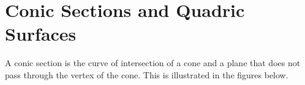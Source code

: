 \graphicspath{{figures/quadric/}}

\renewcommand{\theequation}{\thechapter.\arabic{equation}}
\renewcommand{\thetheorem}{\thechapter.\arabic{theorem}}
\renewcommand{\thebc}{\thechapter.\arabic{theorem}}
\renewcommand{\theeg}{\thechapter.\arabic{theorem}}


\chapter{Conic Sections and Quadric Surfaces}\label{ap:quadric}

A conic section is the curve of intersection of a cone and a plane
that does not pass through the vertex of the cone.
This is illustrated in the figures below.
